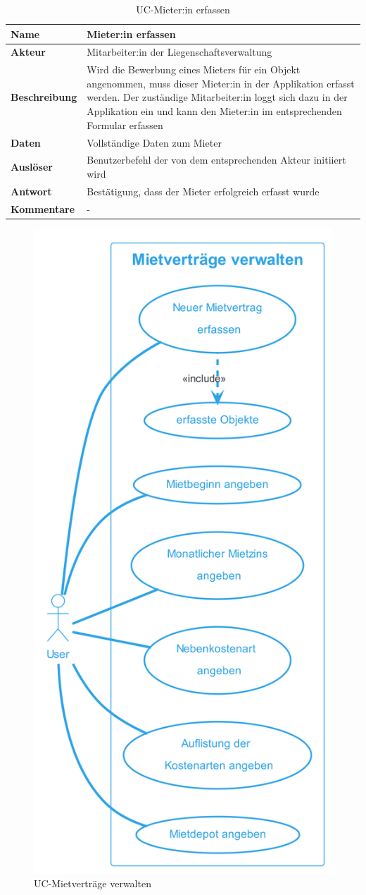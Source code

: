 \begin{table}[H]
  \centering
  \settowidth{}
  \setlength\extrarowheight{2pt}
  \begin{tabulary}{1.0\textwidth}{|a|m{14cm}|}
    \hline
    \textbf{Name}& Mieter:in erfassen\\
    \hline
    \textbf{Akteur}& Mitarbeiter:in der Liegenschaftsverwaltung\\
    \hline 
    \textbf{Beschreibung} & Wird die Bewerbung eines Mieters für ein Objekt angenommen, muss dieser Mieter:in in der Applikation erfasst werden. Der zuständige Mitarbeiter:in loggt sich dazu in der Applikation ein und kann den Mieter:in im entsprechenden Formular erfassen\\
    \hline
    \textbf{Daten} & Vollständige Daten zum Mieter\\
    \hline
    \textbf{Auslöser} & Benutzerbefehl der von dem entsprechenden Akteur initiiert wird\\
    \hline
    \textbf{Antwort} & Bestätigung, dass der Mieter erfolgreich erfasst wurde\\
    \hline
    \textbf{Kommentare} & -\\
    \hline
  \end{tabulary}
  \caption{UC-Mieter:in erfassen}
\end{table}

\begin{figure}[H]
  \begin{center}
    \includegraphics[width=0.43\linewidth]{content/diagrams/out/usecase/mietverträgeVerwalten/MietverträgeVerwalten.png}
    \caption{UC-Mietverträge verwalten}
    \label{MietvertraegeVerwalten}
  \end{center}
\end{figure}

